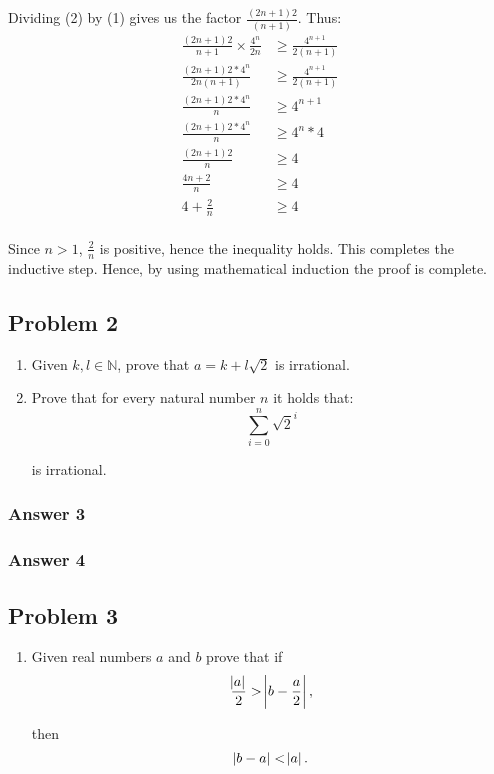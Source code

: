 \documentclass[11pt]{article}
\begin{document}
Dividing (2) by (1) gives us the factor $\frac{(2n+1)2}{(n+1)}$. Thus:
\begin{align*}
  \frac{(2n+1)2}{n+1} \times \frac{4^n}{2n} &\geq \frac{4^{n+1}}{2(n+1)} \\
  \frac{(2n+1)2*4^n}{2n(n+1)} &\geq \frac{4^{n+1}}{2(n+1)} \\
  \frac{(2n+1)2*4^n}{n} &\geq 4^{n+1} \\
  \frac{(2n+1)2*4^n}{n} &\geq 4^{n}*4 \\
  \frac{(2n+1)2}{n} &\geq 4 \\
  \frac{4n+2}{n} &\geq 4 \\
  4 + \frac{2}{n} &\geq 4 \\
\end{align*}

Since $n > 1$, $\frac{2}{n}$ is positive, hence the inequality holds.
This completes the inductive step.  Hence, by using mathematical induction
the proof is complete.
\subsection{Problem 2}
\label{sec-1-2}
\begin{enumerate}
\item Given $k, l \in \mathbb{N}$, prove that $a=k+l\sqrt{2}$ is irrational.
\item Prove that for every natural number $n$ it holds that:
\begin{equation*}
   \sum_{i=0}^n \sqrt{2}^i
\end{equation*}

is irrational.
\end{enumerate}

\subsubsection{Answer 3}
\label{sec-1-2-1}
\subsubsection{Answer 4}
\label{sec-1-2-2}
\subsection{Problem 3}
\label{sec-1-3}
\begin{enumerate}
\item Given real numbers $a$ and $b$ prove that if
\begin{equation*}
   \frac{\abs{a}}{2}>\abs{b-\frac{a}{2}},
\end{equation*}

then
\begin{equation*}
   \abs{b-a}<\abs{a}.
\end{equation*}
\end{enumerate}
\end{document}
